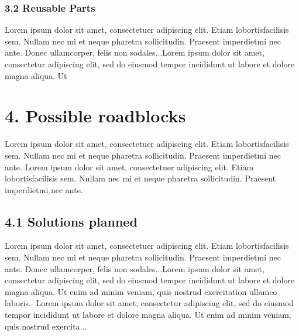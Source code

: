 \documentclass[a4paper, twoside]{report}
\begin{document}
\subsubsection*{3.2 Reusable Parts}
Lorem  ipsum  dolor  sit  amet,  consectetuer  adipiscing  
elit.   Etiam  lobortisfacilisis sem.  Nullam nec mi et 
neque pharetra sollicitudin.  Praesent imperdietmi nec ante. 
Donec ullamcorper, felis non sodales...Lorem ipsum dolor sit amet, consectetur adipiscing elit, sed do 
eiusmod tempor incididunt ut labore et dolore magna aliqua. Ut 


\section*{}

\section*{4. Possible roadblocks}
Lorem  ipsum  dolor  sit  amet,  consectetuer  adipiscing  
elit.   Etiam  lobortisfacilisis sem.  Nullam nec mi et 
neque pharetra sollicitudin.  Praesent imperdietmi nec ante. 
Lorem  ipsum  dolor  sit  amet,  consectetuer  adipiscing  
elit.   Etiam  lobortisfacilisis sem.  Nullam nec mi et 
neque pharetra sollicitudin.  Praesent imperdietmi nec ante. 
\subsection*{4.1 Solutions planned}
Lorem  ipsum  dolor  sit  amet,  consectetuer  adipiscing  
elit.   Etiam  lobortisfacilisis sem.  Nullam nec mi et 
neque pharetra sollicitudin.  Praesent imperdietmi nec ante. 
Donec ullamcorper, felis non sodales...Lorem ipsum dolor sit amet, consectetur adipiscing elit, sed do 
eiusmod tempor incididunt ut labore et dolore magna aliqua. Ut 
enim ad minim veniam, quis nostrud exercitation ullamco laboris..
 Lorem ipsum dolor sit amet, consectetur adipiscing elit, sed do 
eiusmod tempor incididunt ut labore et dolore magna aliqua. Ut 
enim ad minim veniam, quis nostrud exercita...
\end{document}
